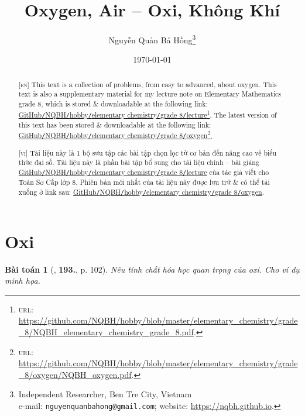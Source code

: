 \documentclass{article}
\title{Oxygen, Air -- Oxi, Không Khí}
\author{Nguyễn Quản Bá Hồng\footnote{Independent Researcher, Ben Tre City, Vietnam\\e-mail: \texttt{nguyenquanbahong@gmail.com}; website: \url{https://nqbh.github.io}.}}
\date{\today}
\numberwithin{equation}{section}
\newtheorem{baitoan}{Bài toán}
\begin{document}
\maketitle
\begin{abstract}
	\textsc{[en]} This text is a collection of problems, from easy to advanced, about oxygen. This text is also a supplementary material for my lecture note on Elementary Mathematics grade 8, which is stored \& downloadable at the following link: \href{https://github.com/NQBH/hobby/blob/master/elementary_chemistry/grade_8/NQBH_elementary_chemistry_grade_8.pdf}{GitHub\texttt{/}NQBH\texttt{/}hobby\texttt{/}elementary chemistry\texttt{/}grade 8\texttt{/}lecture}\footnote{\textsc{url}: \url{https://github.com/NQBH/hobby/blob/master/elementary_chemistry/grade_8/NQBH_elementary_chemistry_grade_8.pdf}.}. The latest version of this text has been stored \& downloadable at the following link: \href{https://github.com/NQBH/hobby/blob/master/elementary_chemistry/grade_8/oxygen/NQBH_oxygen.pdf}{GitHub\texttt{/}NQBH\texttt{/}hobby\texttt{/}elementary chemistry\texttt{/}grade 8\texttt{/}oxygen}\footnote{\textsc{url}: \url{https://github.com/NQBH/hobby/blob/master/elementary_chemistry/grade_8/oxygen/NQBH_oxygen.pdf}.}.
	\vspace{2mm}
	
	\textsc{[vi]} Tài liệu này là 1 bộ sưu tập các bài tập chọn lọc từ cơ bản đến nâng cao về biểu thức đại số. Tài liệu này là phần bài tập bổ sung cho tài liệu chính -- bài giảng \href{https://github.com/NQBH/hobby/blob/master/elementary_chemistry/grade_8/NQBH_elementary_chemistry_grade_8.pdf}{GitHub\texttt{/}NQBH\texttt{/}hobby\texttt{/}elementary chemistry\texttt{/}grade 8\texttt{/}lecture} của tác giả viết cho Toán Sơ Cấp lớp 8. Phiên bản mới nhất của tài liệu này được lưu trữ \& có thể tải xuống ở link sau: \href{https://github.com/NQBH/hobby/blob/master/elementary_chemistry/grade_8/oxygen/NQBH_oxygen.pdf}{GitHub\texttt{/}NQBH\texttt{/}hobby\texttt{/}elementary chemistry\texttt{/}grade 8\texttt{/}oxygen}.
\end{abstract}
\tableofcontents
\newpage


\section{Oxi}

\begin{baitoan}[\cite{An_400_BT_Hoa_Hoc_8_2020}, \textbf{193.}, p. 102]
	Nêu tính chất hóa học quan trọng của oxi. Cho ví dụ minh họa.
\end{baitoan}
\end{document}
